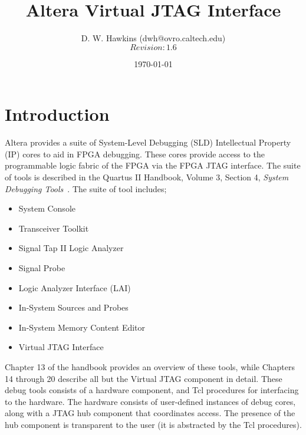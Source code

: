\documentclass[10pt,twoside]{article}
\begin{document}
\title{Altera Virtual JTAG Interface}
\author{D. W. Hawkins (dwh@ovro.caltech.edu)\\
        $$Revision: 1.6 $$}
\date{\today}
\maketitle

\thispagestyle{empty}

\tableofcontents

\cleardoublepage

\pagestyle{fancy}
\chead{}
\rhead{\today}
\lfoot{}
\cfoot{}
\rfoot{\thepage}
\renewcommand{\headrulewidth}{0.4pt}
\renewcommand{\footrulewidth}{0.4pt}

\lstset{language=Tcl}

\section{Introduction}

Altera provides a suite of System-Level Debugging (SLD) 
Intellectual Property (IP) cores to aid in FPGA debugging.
These cores provide access to the programmable logic fabric
of the FPGA via the FPGA JTAG interface.
The suite of tools is described in the Quartus II Handbook,
Volume 3, Section 4, {\em System Debugging 
Tools}~\cite{Altera_Quartus_Handbook_2010}.
The suite of tool includes;
%
\begin{itemize}
\item System Console
\item Transceiver Toolkit
\item Signal Tap II Logic Analyzer
\item Signal Probe
\item Logic Analyzer Interface (LAI)
\item In-System Sources and Probes
\item In-System Memory Content Editor
\item Virtual JTAG Interface
\end{itemize}
%
Chapter 13 of the handbook provides an overview of
these tools, while Chapters 14 through 20 describe all but
the Virtual JTAG component in detail.
These debug tools consists of a hardware component, and
Tcl procedures for interfacing to the hardware. 
The hardware consists of user-defined instances of
debug cores, along with a JTAG hub component that 
coordinates access. The presence of the hub component 
is transparent to the user (it is abstracted by the Tcl
procedures).
\end{document}
